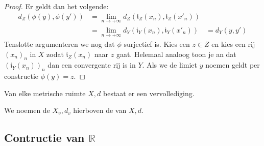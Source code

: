 \documentclass[main.tex]{subfiles}
\begin{document}
\begin{bst}
\begin{proof}
    Er geldt dan het volgende:
    \begin{align*}
      d_{Z}(\phi(y),\phi(y'))
      &= \lim_{n\rightarrow +\infty}d_{Z}(\mathfrak{i}_{Z}(x_{n}),\mathfrak{i}_{Z}(x'_{n}))\\
      &= \lim_{n\rightarrow +\infty}d_{Y}(\mathfrak{i}_{Y}(x_{n}),\mathfrak{i}_{Y}(x'_{n}))
      &= d_{Y}(y,y')
    \end{align*}
    Tenslotte argumenteren we nog dat $\phi$ surjectief is.
    Kies een $z\in Z$ en kies een rij $(x_{n})_{n}$ in $X$ zodat $\mathfrak{i}_{Z}(x_{n})$ naar $z$ gaat.
    Helemaal analoog toon je an dat $(\mathfrak{i}_{Y}(x_{n}))_{n}$ dan een convergente rij is in $Y$.
    Als we de limiet $y$ noemen geldt per constructie $\phi(y) = z$.
  \end{proof}
\end{bst}

\begin{bst}
  Van elke metrische ruimte $X,d$ bestaat er een vervollediging.
\end{bst}

\begin{de}
  We noemen de $X_{v},d_{v}$ hierboven de  van $X,d$.
\end{de}

\subsection{Contructie van $\mathbb{R}$}
\label{sec:contr-van-mathbbr}

\end{document}
